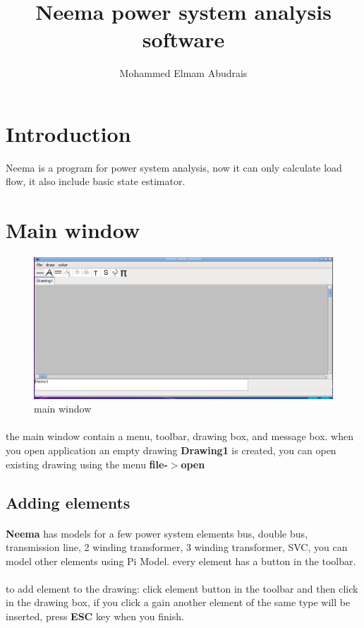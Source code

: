 \documentclass{article}
\title{Neema power system analysis software}
\author{Mohammed Elmam Abudrais}
\begin{document}
	\maketitle
	\newpage
	\tableofcontents
	\newpage
	\newpage
	\section{Introduction}
	Neema is a program for power system analysis, now it can only calculate load flow, it also include basic state estimator.
	\section{Main window}
\begin{figure}[h!]
	\includegraphics[width=\linewidth]{neemamain.png}
	\caption{main window}
	\label{fig:fig1}
\end{figure}
\paragraph{}the main window contain a menu, toolbar, drawing box, and message box. when you open application an empty drawing
\textbf{Drawing1} is created, you can open existing drawing using the menu \textbf{file-$>$open}
\subsection{Adding elements}
\paragraph{}
\textbf{Neema} has models for a few power system elements bus, double bus,  transmission line, 2 winding transformer, 3 winding transformer,  SVC, you can model other elements using Pi Model. every element has a button in the toolbar.
\paragraph{}
to add element to the drawing: click element button in the toolbar and then click in the drawing box, if you click a gain another element of the same type will be inserted, press \textbf{ESC} key when you finish.
\end{document}
